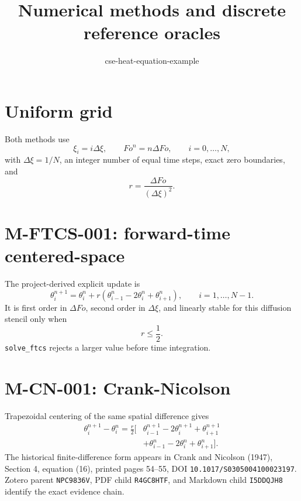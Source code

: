 \documentclass[11pt]{article}
\begin{document}
\title{Numerical methods and discrete reference oracles}
\author{cse-heat-equation-example}
\date{}
\maketitle

\section{Uniform grid}

Both methods use
\[
  \xi_i=i\Delta\xi,\qquad Fo^n=n\Delta Fo,
  \qquad i=0,\ldots,N,
\]
with \(\Delta\xi=1/N\), an integer number of equal time steps, exact zero
boundaries, and
\[
  r=\frac{\Delta Fo}{(\Delta\xi)^2}.
\]

\section{M-FTCS-001: forward-time centered-space}

The project-derived explicit update is
\begin{equation}
  \theta_i^{n+1}
  =\theta_i^n+r\left(
    \theta_{i-1}^n-2\theta_i^n+\theta_{i+1}^n
  \right),
  \qquad i=1,\ldots,N-1.
  \label{eq:ftcs}
\end{equation}
It is first order in \(\Delta Fo\), second order in \(\Delta\xi\), and
linearly stable for this diffusion stencil only when
\begin{equation}
  r\leq\frac{1}{2}.
  \label{eq:ftcs-stability}
\end{equation}
\texttt{solve\_ftcs} rejects a larger value before time integration.

\section{M-CN-001: Crank-Nicolson}

Trapezoidal centering of the same spatial difference gives
\begin{equation}
\begin{split}
  \theta_i^{n+1}-\theta_i^n
  =\frac{r}{2}\big[&
    \theta_{i-1}^{n+1}-2\theta_i^{n+1}+\theta_{i+1}^{n+1}\\
    &+\theta_{i-1}^{n}-2\theta_i^n+\theta_{i+1}^n
  \big].
\end{split}
\label{eq:crank-nicolson}
\end{equation}
The historical finite-difference form appears in Crank and Nicolson (1947),
Section 4, equation (16), printed pages 54--55, DOI
\texttt{10.1017/S0305004100023197}. Zotero parent \texttt{NPC9836V}, PDF
child \texttt{R4GC8HTF}, and Markdown child \texttt{I5DDQJH8} identify the
exact evidence chain.
\end{document}
